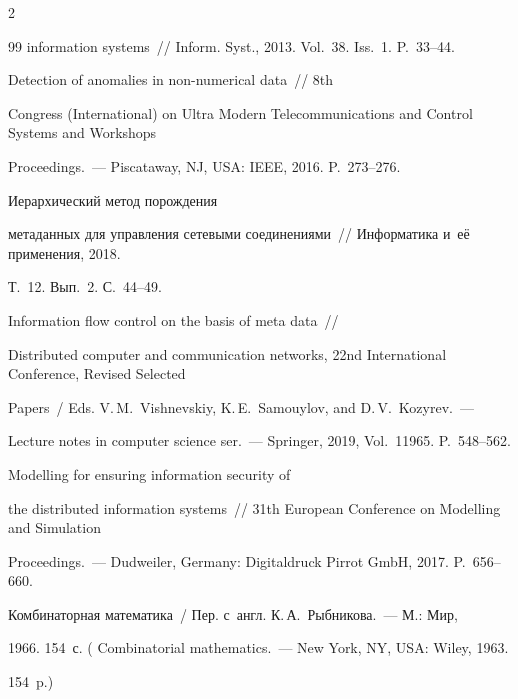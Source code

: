 \begin{multicols}{2}
{{\begin{thebibliography}{99}
information systems~// Inform. Syst., 2013. Vol.~38. Iss.~1. P.~33--44. 




 Detection of anomalies in non-numerical data~// 8th 


Congress (International) on Ultra Modern Telecommunications and Control Systems and Workshops 


Proceedings.~--- Piscataway, NJ, USA: IEEE, 2016. P.~273--276.




 Иерархический метод порождения 


метаданных для управления сетевыми соединениями~// Информатика и~её применения, 2018. 


Т.~12. Вып.~2. С.~44--49.




 Information flow control on the basis of meta data~//  


Distributed computer and communication networks, 22nd International Conference, Revised Selected 


Papers~/ Eds. V.\,M.~Vishnevskiy, K.\,E.~Samouylov, and D.\,V.~Kozyrev.~---


Lecture notes in computer science ser.~--- Springer, 2019,  Vol.~11965. P.~548--562.




 Modelling for ensuring information security of 


the distributed information systems~// 31th European Conference on Modelling and Simulation 


Proceedings.~--- Dudweiler, Germany: Digitaldruck Pirrot GmbH, 2017. P.~656--660.










 Комбинаторная математика~/ Пер. с~англ. К.\,А.~Рыбникова.~--- М.: Мир, 


1966. 154~с. ( {Combinatorial mathematics.}~--- New York, NY, USA: Wiley, 1963. 


154~p.)








\end{thebibliography}}}
\end{multicols}
